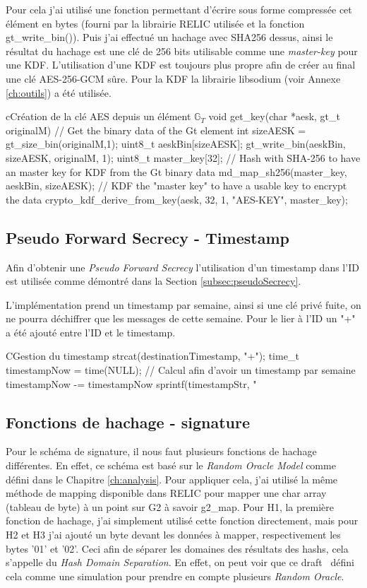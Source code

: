 Pour cela j'ai utilisé une fonction permettant d'écrire sous forme compressée cet élément en bytes (fourni par la librairie RELIC utilisée et la fonction gt\_write\_bin()). Puis j'ai effectué un hachage avec SHA256 dessus, ainsi le résultat du hachage est une clé de 256 bits utilisable comme une \textit{master-key} pour une KDF. L'utilisation d'une KDF est toujours plus propre afin de créer au final une clé AES-256-GCM sûre. Pour la KDF la librairie libsodium (voir Annexe \ref{ch:outils}) a été utilisée.

\begin{sourcebox}{c}{Création de la clé AES depuis un élément $\mathbb{G}_T$}
	void get_key(char *aesk, gt_t originalM) {
		// Get the binary data of the Gt element
		int sizeAESK = gt_size_bin(originalM,1);
		uint8_t aeskBin[sizeAESK];
		gt_write_bin(aeskBin, sizeAESK, originalM, 1);
		uint8_t master_key[32];
		// Hash with SHA-256 to have an master key for KDF from the Gt binary data
		md_map_sh256(master_key, aeskBin, sizeAESK);
		// KDF the "master key" to have a usable key to encrypt the data
		crypto_kdf_derive_from_key(aesk, 32, 1, "AES-KEY", master_key);
	}
\end{sourcebox}

\subsection{Pseudo Forward Secrecy - Timestamp}
Afin d'obtenir une \textit{Pseudo Forward Secrecy} l'utilisation d'un timestamp dans l'ID est utilisée comme démontré dans la Section \ref{subsec:pseudoSecrecy}.

L'implémentation prend un timestamp par semaine, ainsi si une clé privé fuite, on ne pourra déchiffrer que les messages de cette semaine. Pour le lier à l'ID un "+" a été ajouté entre l'ID et le timestamp.
\begin{sourcebox}{C}{Gestion du timestamp}
	strcat(destinationTimestamp, "+");
	time_t timestampNow = time(NULL);
	// Calcul afin d'avoir un timestamp par semaine
	timestampNow -= timestampNow %
	sprintf(timestampStr, "%
\end{sourcebox}

\subsection{Fonctions de hachage - signature}
Pour le schéma de signature, il nous faut plusieurs fonctions de hachage différentes. En effet, ce schéma est basé sur le \textit{Random Oracle Model} comme défini dans le Chapitre \ref{ch:analysis}. Pour appliquer cela, j'ai utilisé la même méthode de mapping disponible dans RELIC pour mapper une char array (tableau de byte) à un point sur G2 à savoir g2\_map.
Pour H1, la première fonction de hachage, j'ai simplement utilisé cette fonction directement, mais pour H2 et H3 j'ai ajouté un byte devant les données à mapper, respectivement les bytes '01' et '02'. Ceci afin de séparer les domaines des résultats des hashs, cela s'appelle du \textit{Hash Domain Separation}. En effet, on peut voir que ce draft~\cite{irtf-cfrg-hash-to-curve} défini cela comme une simulation pour prendre en compte plusieurs \textit{Random Oracle}.

